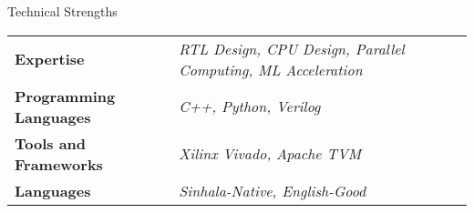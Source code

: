 \documentclass[
	11pt, %
]{./assets/resume} %
\begin{document}
	




\begin{rSection}{Technical Strengths}

	\def\arraystretch{1.5}

	\begin{tabular}{ l l}
		\textbf{Expertise} & \emph{RTL Design, CPU Design, Parallel Computing, ML Acceleration} \\
		\textbf{Programming Languages} & \emph{C++, Python, Verilog} \\
		\textbf{Tools and Frameworks} & \emph{Xilinx Vivado, Apache TVM} \\ 
		\textbf{Languages} & \emph{Sinhala-Native, English-Good} \\
	\end{tabular}

\end{rSection}

\end{document}
